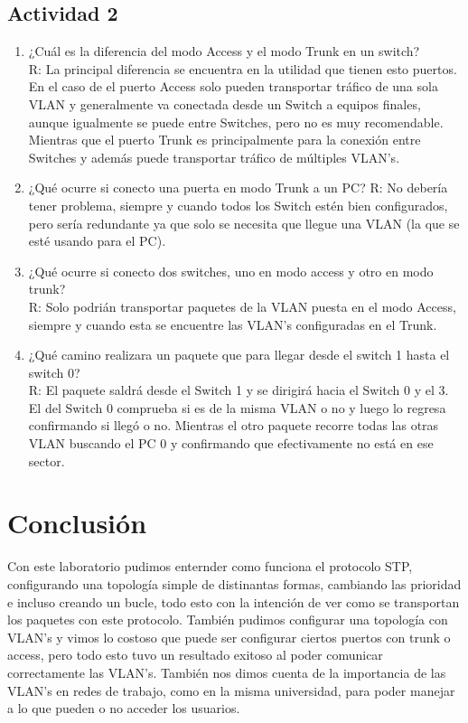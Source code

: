 \documentclass[onecolumn,11pts]{IEEEtran}
\begin{document}
\subsection{Actividad 2}
\begin{enumerate}
    \item ¿Cuál es la diferencia del modo Access y el modo Trunk en un switch?\\
R: La principal diferencia se encuentra en la utilidad que tienen esto puertos. En el caso de el puerto Access solo pueden transportar tráfico de una sola VLAN  y generalmente va conectada desde un Switch a equipos finales, aunque igualmente se puede entre Switches, pero no es muy recomendable. Mientras que el puerto Trunk es principalmente para la conexión entre Switches y además puede transportar tráfico de múltiples VLAN’s.\\
    \item ¿Qué ocurre si conecto una puerta en modo Trunk a un PC?
R: No debería tener problema, siempre y cuando todos los Switch estén bien configurados, pero sería redundante ya que solo se necesita que llegue una VLAN (la que se esté usando para el PC).\\
    \item ¿Qué ocurre si conecto dos switches, uno en modo access y otro en modo trunk?\\
R: Solo podrián transportar paquetes de la VLAN puesta en el modo Access, siempre y cuando esta se encuentre las VLAN’s configuradas en el Trunk.\\
    \item ¿Qué camino realizara un paquete que para llegar desde el switch 1 hasta el switch 0?\\
    R: El paquete saldrá desde el Switch 1 y se dirigirá hacia el Switch 0 y el 3. El del Switch 0 comprueba si es de la misma VLAN o no y luego lo regresa confirmando si llegó o no. Mientras el otro paquete recorre todas las otras VLAN buscando el PC 0 y confirmando que efectivamente no está en ese sector. 




\end{enumerate}
\newpage
\section{Conclusión}
Con este laboratorio pudimos enternder como funciona el protocolo STP, configurando una topología simple de distinantas formas, cambiando las prioridad e incluso creando un bucle, todo esto con la intención de ver como se transportan los paquetes con este protocolo. También pudimos configurar una topología con VLAN's y vimos lo costoso que puede ser configurar ciertos puertos con trunk o access, pero todo esto tuvo un resultado exitoso al poder comunicar correctamente las VLAN's. También nos dimos cuenta de la importancia de las VLAN's en redes de trabajo, como en la misma universidad, para poder manejar a lo que pueden o no acceder los usuarios.
\end{document}

